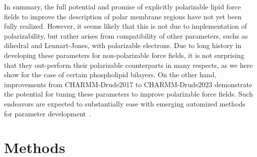 \documentclass[journal=jacsat,manuscript=article,layout=singlecolumn]{achemso}
\begin{document}
 In summary, the full potential and promise of explicitly polarizable lipid force fields to improve the description of polar membrane regions have not yet been fully realized. However, it seems likely that this is not due to implementation of polarizability, but rather arises from compatibility of other parameters, suchs as dihedral and Lennart-Jones, with polarizable electrons. Due to long history in developing these parameters for non-polarizable force fields, it is not surprising that they 
 out-perform their polarizable counterparts in many respects, as we here show for the case of certain phospholipid bilayers. On the other hand, improvements  
from CHARMM-Drude2017 to CHARMM-Drude2023 demonstrate the potential for tuning these parameters to improve polarizable force fields. Such endeavors are expected to substantially ease with emerging automized methods for parameter development~\cite{Antila2022,yu2023drude}.
 

\section{Methods}
\end{document}
